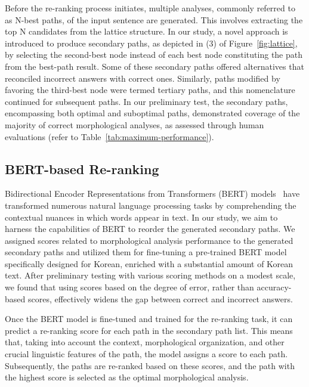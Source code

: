 \documentclass[AMS,STIX2COL]{WileyNJD-v2}
\begin{document}
    Before the re-ranking process initiates, multiple analyses, commonly referred to as N-best paths, of the input sentence are generated.
    This involves extracting the top N candidates from the lattice structure.
    In our study, a novel approach is introduced to produce secondary paths, as depicted in (3) of Figure~\ref{fig:lattice}, by selecting the second-best node instead of each best node constituting the path from the best-path result.
    Some of these secondary paths offered alternatives that reconciled incorrect answers with correct ones.
    Similarly, paths modified by favoring the third-best node were termed tertiary paths, and this nomenclature continued for subsequent paths.
    In our preliminary test, the secondary paths, encompassing both optimal and suboptimal paths, demonstrated coverage of the majority of correct morphological analyses, as assessed through human evaluations (refer to Table~\ref{tab:maximum-performance}).

    \subsection{BERT-based Re-ranking}\label{subsec:bert-based-reranking}

    Bidirectional Encoder Representations from Transformers (BERT) models~\cite{Devlin2019} have transformed numerous natural language processing tasks by comprehending the contextual nuances in which words appear in text.
    In our study, we aim to harness the capabilities of BERT to reorder the generated secondary paths.
    We assigned scores related to morphological analysis performance to the generated secondary paths and utilized them for fine-tuning a pre-trained BERT model specifically designed for Korean, enriched with a substantial amount of Korean text.
    After preliminary testing with various scoring methods on a modest scale, we found that using scores based on the degree of error, rather than accuracy-based scores, effectively widens the gap between correct and incorrect answers.

    Once the BERT model is fine-tuned and trained for the re-ranking task, it can predict a re-ranking score for each path in the secondary path list.
    This means that, taking into account the context, morphological organization, and other crucial linguistic features of the path, the model assigns a score to each path.
    Subsequently, the paths are re-ranked based on these scores, and the path with the highest score is selected as the optimal morphological analysis.
\end{document}

